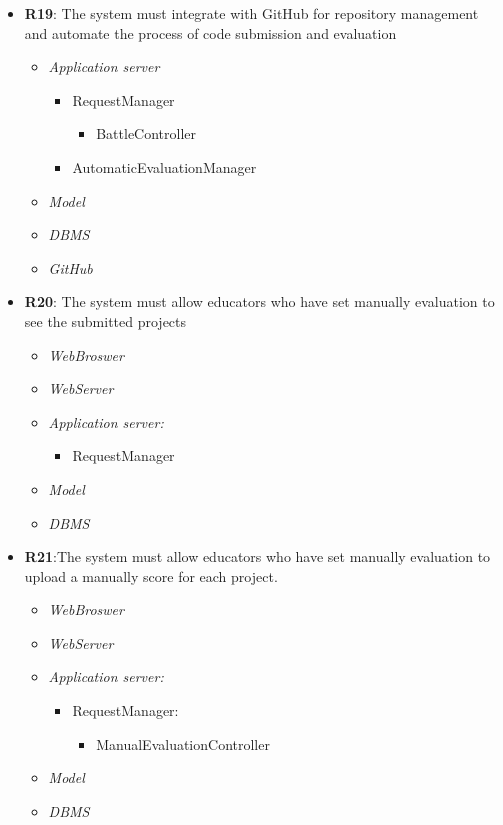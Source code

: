 \begin{itemize}
 \item \textbf{R19}: The system must integrate with GitHub for repository management and automate the process of
code submission and evaluation
\begin{itemize}
    \item \textit{Application server}
    \begin{itemize}
        \item RequestManager
        \begin{itemize}
            \item BattleController
        \end{itemize}
        \item AutomaticEvaluationManager
    \end{itemize}
    \item \textit{Model}
    \item \textit{DBMS}
    \item \textit{GitHub}
\end{itemize}

            
  \item \textbf{R20}: The system must allow educators who have set manually evaluation to see the submitted projects
            \begin{itemize}
                 \item \textit{WebBroswer}
                \item \textit{WebServer}
                \item \textit{Application server:}\begin{itemize}
                    \item RequestManager
                \end{itemize}
                \item \textit{Model}
                \item \textit{DBMS}
                \end{itemize}
        
  \item \textbf{R21}:The system must allow educators who have set manually evaluation to upload a manually score for
each project.
            \begin{itemize}
               \item \textit{WebBroswer}
                \item \textit{WebServer}
                \item \textit{Application server:}\begin{itemize}
                    \item RequestManager:\begin{itemize}
                        \item ManualEvaluationController
                    \end{itemize}
                \end{itemize}
                \item \textit{Model}
                \item \textit{DBMS}
                \end{itemize}



\end{itemize}
